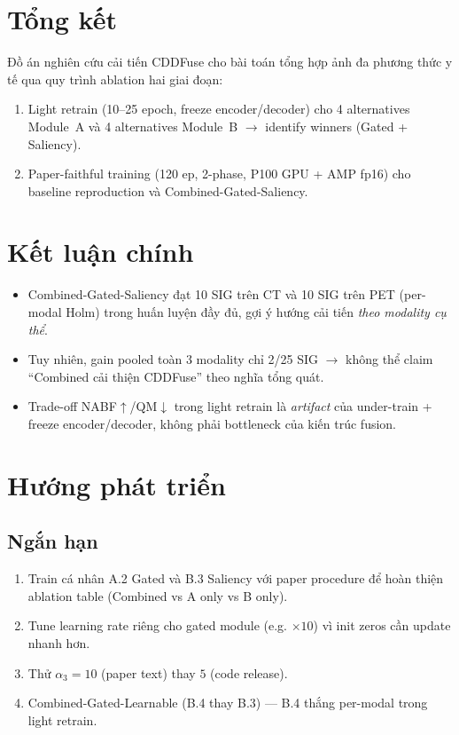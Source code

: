 \section{Tổng kết}
\label{sec:summary}

Đồ án nghiên cứu cải tiến CDDFuse cho bài toán tổng hợp ảnh đa phương thức y tế qua quy trình ablation hai giai đoạn:
\begin{enumerate}
    \item Light retrain (10--25 epoch, freeze encoder/decoder) cho 4 alternatives Module~A và 4 alternatives Module~B $\to$ identify winners (Gated + Saliency).
    \item Paper-faithful training (120 ep, 2-phase, P100 GPU + AMP fp16) cho baseline reproduction và Combined-Gated-Saliency.
\end{enumerate}

\section{Kết luận chính}
\label{sec:conclusion-main}

\begin{itemize}
    \item Combined-Gated-Saliency đạt 10 SIG trên CT và 10 SIG trên PET (per-modal Holm) trong huấn luyện đầy đủ, gợi ý hướng cải tiến \emph{theo modality cụ thể}.
    \item Tuy nhiên, gain pooled toàn 3 modality chỉ 2/25 SIG $\to$ không thể claim ``Combined cải thiện CDDFuse'' theo nghĩa tổng quát.
    \item Trade-off NABF$\uparrow$/QM$\downarrow$ trong light retrain là \emph{artifact} của under-train + freeze encoder/decoder, không phải bottleneck của kiến trúc fusion.
\end{itemize}

\section{Hướng phát triển}
\label{sec:future}

\subsection{Ngắn hạn}
\begin{enumerate}
    \item Train cá nhân A.2 Gated và B.3 Saliency với paper procedure để hoàn thiện ablation table (Combined vs A only vs B only).
    \item Tune learning rate riêng cho gated module (e.g. $\times 10$) vì init zeros cần update nhanh hơn.
    \item Thử $\alpha_3 = 10$ (paper text) thay $5$ (code release).
    \item Combined-Gated-Learnable (B.4 thay B.3) — B.4 thắng per-modal trong light retrain.
\end{enumerate}

